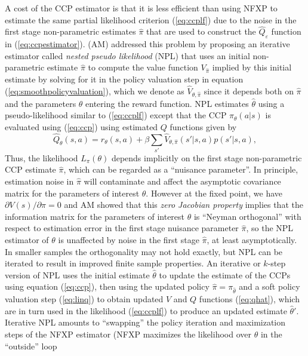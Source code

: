 A cost of the CCP estimator is that it is less efficient than using NFXP to estimate the same partial likelihood criterion (\ref{eq:ccplf})
due to the noise in the first stage non-parametric estimates $\hat\pi$ that are used to construct
the $\hat Q_\varepsilon$ function in (\ref{eq:ccpestimator}).  \citet{AguirregabiriaMira:2002} (AM) addressed this problem
by proposing an iterative estimator called {\it nested pseudo likelihood\/} (NPL)  that uses an initial non-parametric estimate $\hat\pi$ 
to compute the value function $V_{\hat\pi}$ implied by this initial estimate by solving for it in the policy valuation step
in equation (\ref{eq:smoothpolicyvaluation}), which we denote as $\hat V_{\theta,\hat\pi}$ since it depends
both on $\hat\pi$ and the parameters $\theta$ entering
the reward function. NPL  estimates  $\hat\theta$ using a pseudo-likelihood similar to (\ref{eq:ccplf})
except that the CCP $\pi_\theta(a|s)$ is evaluated using (\ref{eq:ccp}) using estimated $Q$ functions given by
\begin{equation}
                  \hat Q_\theta(s,a)=r_\theta(s,a)+\beta \sum_{s'}\hat V_{\theta,\hat\pi}(s'|s,a)p(s'|s,a),
\label{eq:qhat}
\end{equation}
Thus, the likelihood $L_\pi(\theta)$ depends implicitly on the first stage non-parametric CCP estimate $\hat\pi$, which can be regarded
as a ``nuisance parameter''. In principle, estimation noise in $\hat\pi$ will contaminate and affect the asymptotic 
covariance matrix for the parameters of interest $\theta$. However 
at the fixed point, we have $\partial V(s)/\partial \pi=0$ and AM showed that this  {\it zero Jacobian property\/}  
implies that  the information matrix for the parameters of interest $\theta$ 
is ``Neyman orthogonal'' with respect to estimation error in the first stage nuisance parameter $\hat\pi$, 
so the NPL estimator of $\theta$ is unaffected by noise in the first stage $\hat\pi$, at least asymptotically.
In smaller samples the orthogonality may not hold exactly, but 
NPL can be iterated to result in improved finite sample properties.
An iterative or $k$-step version of NPL
uses the initial estimate  $\hat\theta$ to update the estimate of the CCPs using equation (\ref{eq:ccp}), then using the updated policy
$\hat\pi=\pi_{\hat\theta}$ and a soft policy valuation step (\ref{eq:linq}) to obtain
updated $V$ and $Q$ functions (\ref{eq:qhat}),  which are in turn
used in the likelihood (\ref{eq:ccplf}) to produce an updated estimate $\hat\theta'$. Iterative NPL amounts to ``swapping''
the policy iteration and maximization steps of the NFXP estimator (NFXP  maximizes the likelihood over $\theta$ in the ``outside'' loop
